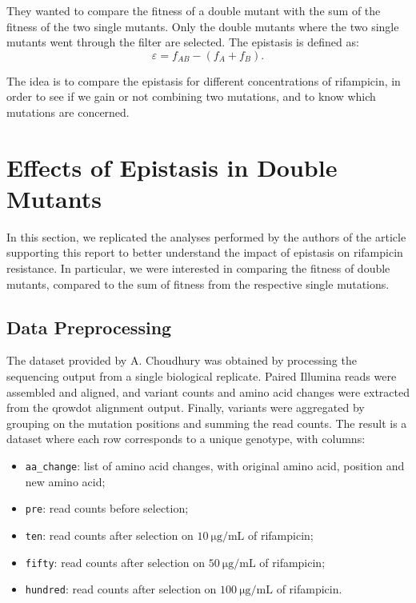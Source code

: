 \documentclass[12pt]{article}
\begin{document}
  They wanted to compare the fitness of a double mutant with the sum of the
  fitness of the two single mutants. Only the double mutants where the two
  single mutants went through the filter are selected. The epistasis is defined
  as:
  \begin{equation}\label{eq:epistasis}
    \varepsilon = f_{AB} - (f_A + f_B).
  \end{equation}

  The idea is to compare the epistasis for different concentrations of
  rifampicin, in order to see if we gain or not combining two mutations, and to
  know which mutations are concerned.

  \section{Effects of Epistasis in Double Mutants}

  In this section, we replicated the analyses performed by the authors of the
  article supporting this report to better understand the impact of epistasis
  on rifampicin resistance. In particular, we were interested in comparing the
  fitness of double mutants, compared to the sum of fitness from the respective
  single mutations.

  \subsection{Data Preprocessing}

  The dataset provided by A. Choudhury was obtained by processing the
  sequencing output from a single biological replicate. Paired Illumina reads
  were assembled and aligned, and variant counts and amino acid changes were
  extracted from the qrowdot alignment output. Finally, variants were
  aggregated by grouping on the mutation positions and summing the read counts.
  The result is a dataset where each row corresponds to a unique genotype, with
  columns:
  \begin{itemize}
    \item \lstinline{aa_change}: list of amino acid changes, with original
      amino acid, position and new amino acid;
    \item \lstinline{pre}: read counts before selection;
    \item \lstinline{ten}: read counts after selection on 
      $\SI{10}{\micro\gram\per\milli\liter}$ of rifampicin;
    \item \lstinline{fifty}: read counts after selection on 
      $\SI{50}{\micro\gram\per\milli\liter}$ of rifampicin; 
    \item \lstinline{hundred}: read counts after selection on 
      $\SI{100}{\micro\gram\per\milli\liter}$ of rifampicin. 
  \end{itemize}
\end{document}

